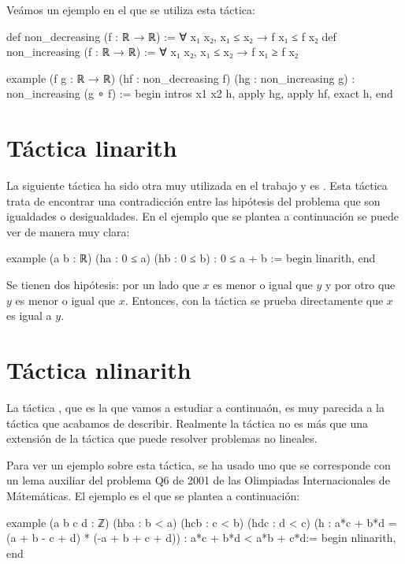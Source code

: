 Veámos un ejemplo en el que se utiliza esta táctica:
\begin{leancode}
def non_decreasing (f : ℝ → ℝ) := ∀ x₁ x₂, x₁ ≤ x₂ → f x₁ ≤ f x₂
def non_increasing (f : ℝ → ℝ) := ∀ x₁ x₂, x₁ ≤ x₂ → f x₁ ≥ f x₂

example (f g : ℝ → ℝ) (hf : non_decreasing f) (hg : non_increasing g) :
non_increasing (g ∘ f) :=
begin
  intros x1 x2 h,
  apply hg,
  apply hf,
  exact h,
end
\end{leancode}

\section{Táctica linarith}

La siguiente táctica ha sido otra muy utilizada en el trabajo y es
. Esta táctica trata de encontrar una
contradicción entre las hipótesis del problema que son igualdades o
desigualdades. En el ejemplo que se plantea a continuación se puede ver
de manera muy clara:

\begin{leancode}
example (a b : ℝ) (ha : 0 ≤ a) (hb : 0 ≤ b) : 0 ≤ a + b :=
begin
  linarith,
end
\end{leancode}

Se tienen dos hipótesis: por un lado que \(x\) es menor o igual que \(y\) y por
otro que \(y\) es menor o igual que \(x\). Entonces, con la táctica
 se prueba directamente que \(x\) es igual a \(y\).


\section{Táctica nlinarith}

La táctica , que es la que vamos a estudiar a
continuaón, es muy parecida a la táctica  que
acabamos de describir. Realmente la táctica  no
es más que una extensión de la táctica  que puede
resolver problemas no lineales.

Para ver un ejemplo sobre esta táctica, se ha usado uno que se corresponde con
un lema auxiliar del problema Q6 de 2001 de las Olimpiadas Internacionales de
Mátemáticas. El ejemplo es el que se plantea a continuación:

\begin{leancode}
example (a b c d : ℤ)
  (hba : b < a)
  (hcb : c < b)
  (hdc : d < c)
  (h : a*c + b*d = (a + b - c + d) * (-a + b + c + d))
  : a*c + b*d < a*b + c*d:=
begin
  nlinarith,
end
\end{leancode}

